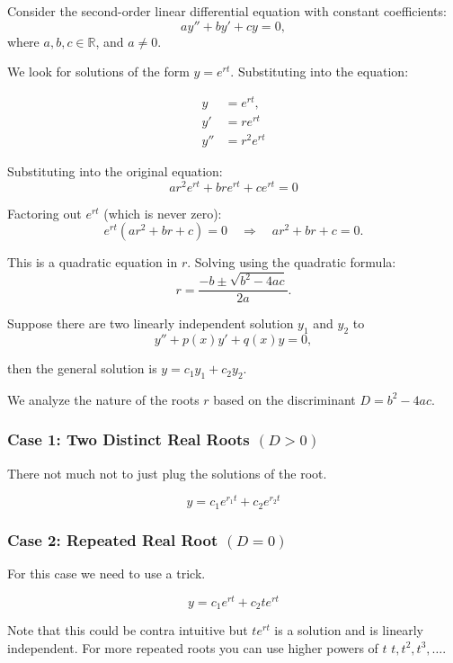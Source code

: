 Consider the second-order linear differential equation with constant coefficients:
\[
a y'' + b y' + c y = 0,
\]
where \( a, b, c \in \mathbb{R} \), and \( a \neq 0 \).

We look for solutions of the form \( y = e^{rt} \). Substituting into the equation:

\begin{align*}
y &= e^{rt}, \\
y' &= r e^{rt} \\
y'' &=  r^2 e^{rt}
\end{align*}


Substituting into the original equation:
\[
ar^2 e^{rt} + bre^{rt} + ce^{rt} = 0
\]

Factoring out \( e^{rt} \) (which is never zero):
\[
e^{rt}(ar^2 + br + c) = 0 \quad \Rightarrow \quad ar^2 + br + c = 0.
\]

This is a quadratic equation in \( r \). Solving using the quadratic formula:
\[
r = \frac{-b \pm \sqrt{b^2 - 4ac}}{2a}.
\]

Suppose there are two linearly independent solution \(y_1\) and \(y_2\) to
\[
y'' + p(x)y' + q(x)y = 0,
\]

then the general solution is \(y = c_1 y_1 + c_2 y_2\).
\vspace{\baselineskip}

We analyze the nature of the roots \( r \) based on the discriminant \( D = b^2 - 4ac \).

\subsubsection{Case 1: Two Distinct Real Roots \texorpdfstring{\( (D > 0) \)}{}}

There not much not to just plug the solutions of the root.

\[y = c_1 e^{r_1 t} + c_2 e^{r_2 t}\]

\subsubsection{Case 2: Repeated Real Root \texorpdfstring{\( (D = 0) \)}{}}

For this case we need to use a trick.

\[y = c_1 e^{rt} + c_2 te^{rt}\]

Note that this could be contra intuitive but \(te^{rt}\) is a solution and is linearly independent.
For more repeated roots you can use higher powers of \(t\) \(t, t^2, t^3, \dots\).

